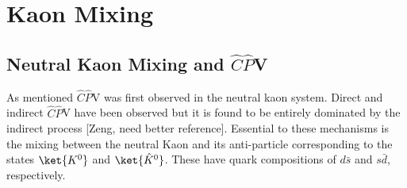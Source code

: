\section{Kaon Mixing}

\subsection{Neutral Kaon Mixing and $\hat{C}\hat{P}$V}

As mentioned $\hat{C}\hat{P}$V was first observed in the neutral kaon system. Direct and indirect $\hat{C}\hat{P}$V have been observed but it is found to be entirely dominated by the indirect process [Zeng, need better reference]. Essential to these mechanisms is the mixing between the neutral Kaon and its anti-particle corresponding to the states $\ket{K^{0}}$ and $\ket{\hat{K}^{0}}$. These have quark compositions of $d \bar{s}$ and $s \bar{d}$, respectively.     
